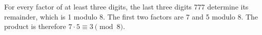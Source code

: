 For every factor of at least three digits, the last three digits 777 determine its remainder, which is 1 modulo 8. The first two factors are 7 and 5 modulo 8. The product is therefore $ 7\cdot5\equiv\boxed3\pmod8 $.
